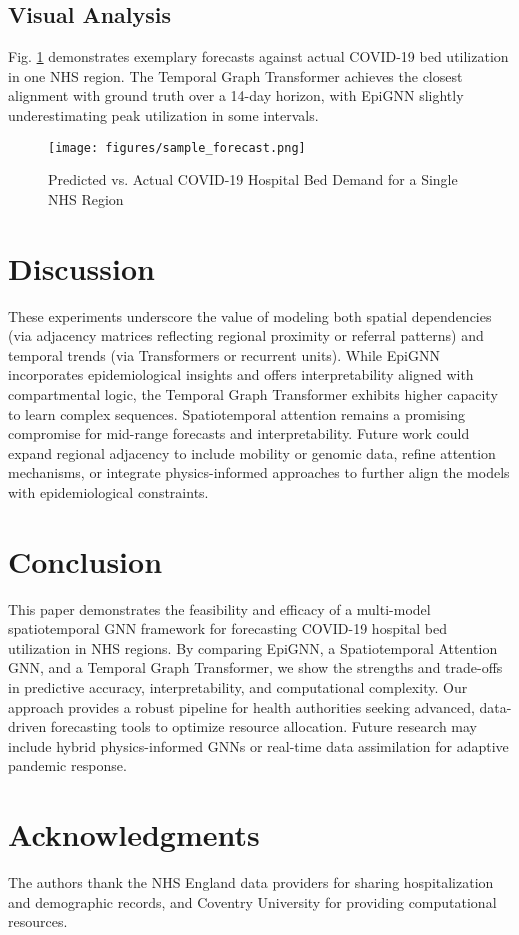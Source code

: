 \documentclass[lettersize, journal]{IEEEtran}
\begin{document}
\subsection{Visual Analysis}
Fig. \ref{fig:prediction} demonstrates exemplary forecasts against actual COVID-19 bed utilization in one NHS region. The Temporal Graph Transformer achieves the closest alignment with ground truth over a 14-day horizon, with EpiGNN slightly underestimating peak utilization in some intervals.

\begin{figure}[h]
    \centering
    \texttt{[image: figures/sample\_forecast.png]}
    \caption{Predicted vs. Actual COVID-19 Hospital Bed Demand for a Single NHS Region}
    \label{fig:prediction}
\end{figure}

\section{Discussion}
These experiments underscore the value of modeling both spatial dependencies (via adjacency matrices reflecting regional proximity or referral patterns) and temporal trends (via Transformers or recurrent units). While EpiGNN incorporates epidemiological insights and offers interpretability aligned with compartmental logic, the Temporal Graph Transformer exhibits higher capacity to learn complex sequences. Spatiotemporal attention remains a promising compromise for mid-range forecasts and interpretability. Future work could expand regional adjacency to include mobility or genomic data, refine attention mechanisms, or integrate physics-informed approaches to further align the models with epidemiological constraints.

\section{Conclusion}
This paper demonstrates the feasibility and efficacy of a multi-model spatiotemporal GNN framework for forecasting COVID-19 hospital bed utilization in NHS regions. By comparing EpiGNN, a Spatiotemporal Attention GNN, and a Temporal Graph Transformer, we show the strengths and trade-offs in predictive accuracy, interpretability, and computational complexity. Our approach provides a robust pipeline for health authorities seeking advanced, data-driven forecasting tools to optimize resource allocation. Future research may include hybrid physics-informed GNNs or real-time data assimilation for adaptive pandemic response.

\section*{Acknowledgments}
The authors thank the NHS England data providers for sharing hospitalization and demographic records, and Coventry University for providing computational resources.



\end{document}
